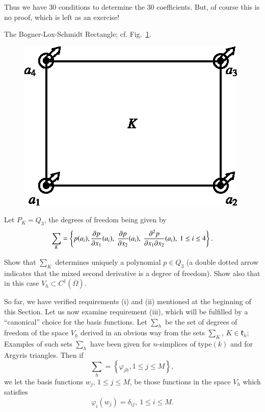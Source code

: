 Thus we have 30 conditions to determine the 30 coefficients. But, of
course this is no proof, which is left as an exercise!

\begin{exercise}\label{chap4-exer4.9}
The Bogner-Lox-Schmidt Rectangle; cf. Fig.~\ref{chap4-fig4.10}.
\begin{figure}[H]
\centering
\includegraphics{figure/fig4.10.eps}
\caption{}\label{chap4-fig4.10}
\end{figure}

Let $P_{K}=Q_{3}$, the degrees of freedom being given by
$$
\sum_{K}=\left\{p(a_{i}),\frac{\partial p}{\partial x_{1}}(a_{i}),\ \frac{\partial p}{\partial
  x_{2}}(a_{i}),\ \frac{\partial^{2}p}{\partial x_{1}\partial x_{2}}(a_{i}),\ 1\leq
i\leq 4\right\}.
$$

Show that $\sum_{K}$ determines uniquely a polynomial $p\in Q_{3}$ (a
double dotted arrow indicates that the mixed second derivative is a
degree of freedom). Show also that in this case $V_{h}\subset
C^{1}(\overline{\Omega})$. 
\end{exercise}

So far, we have verified requirements (i) and (ii) mentioned at the
beginning of this Section. Let us now examine requirement (iii), which
will be fulfilled by a ``canonical'' choice for the basis
functions. Let $\sum_{h}$ be the set of degrees of freedom of the
space $V_{h}$ derived in an obvious way from the sets $\sum_{K}$,
$K\in \mathfrak{k}_{h}$; Examples of such sets $\sum_{h}$ have been
given for $n$-simplices of type\pageoriginale $(k)$ and for Argyris
triangles. Then if
$$
\sum_{h}=\left\{\varphi_{jh},1\leq j\leq M\right\},
$$
we let the basis functions $w_{j}$, $1\leq j\leq M$, be those
functions in the space $V_{h}$ which satisfies
$$
\varphi_{i}(w_{j})=\delta_{ij},\ 1\leq i\leq M.
$$

